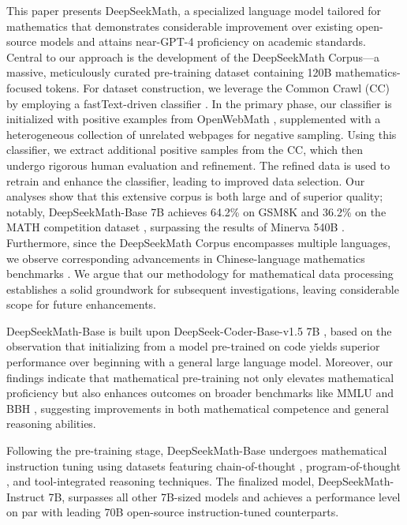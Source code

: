 This paper presents DeepSeekMath, a specialized language model tailored for mathematics that demonstrates considerable improvement over existing open-source models and attains near-GPT-4 proficiency on academic standards. Central to our approach is the development of the DeepSeekMath Corpus—a massive, meticulously curated pre-training dataset containing 120B mathematics-focused tokens. For dataset construction, we leverage the Common Crawl (CC) by employing a fastText-driven classifier \citep{joulin2016fasttext}. In the primary phase, our classifier is initialized with positive examples from OpenWebMath \citep{openwebmath}, supplemented with a heterogeneous collection of unrelated webpages for negative sampling. Using this classifier, we extract additional positive samples from the CC, which then undergo rigorous human evaluation and refinement. The refined data is used to retrain and enhance the classifier, leading to improved data selection. Our analyses show that this extensive corpus is both large and of superior quality; notably, DeepSeekMath-Base 7B achieves 64.2\% on GSM8K \citep{gsm8k} and 36.2\% on the MATH competition dataset \citep{MATH}, surpassing the results of Minerva 540B \citep{minerva}. Furthermore, since the DeepSeekMath Corpus encompasses multiple languages, we observe corresponding advancements in Chinese-language mathematics benchmarks \citep{wei2023cmath,agieval}. We argue that our methodology for mathematical data processing establishes a solid groundwork for subsequent investigations, leaving considerable scope for future enhancements.

DeepSeekMath-Base is built upon DeepSeek-Coder-Base-v1.5 7B \citep{deepseek-coder}, based on the observation that initializing from a model pre-trained on code yields superior performance over beginning with a general large language model. Moreover, our findings indicate that mathematical pre-training not only elevates mathematical proficiency but also enhances outcomes on broader benchmarks like MMLU \citep{mmlu} and BBH \citep{bbh}, suggesting improvements in both mathematical competence and general reasoning abilities.

Following the pre-training stage, DeepSeekMath-Base undergoes mathematical instruction tuning using datasets featuring chain-of-thought \citep{cot}, program-of-thought \citep{pot,pal}, and tool-integrated reasoning \citep{tora} techniques. The finalized model, DeepSeekMath-Instruct 7B, surpasses all other 7B-sized models and achieves a performance level on par with leading 70B open-source instruction-tuned counterparts.


